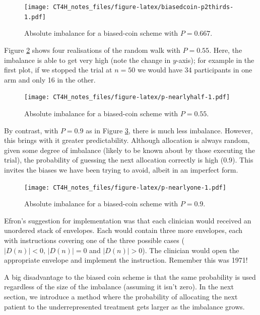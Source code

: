 \documentclass[
  openany]{book}
\theoremstyle{definition}
\theoremstyle{definition}
\theoremstyle{definition}
\theoremstyle{definition}
\theoremstyle{remark}
\begin{document}
\begin{figure}
\centering
\texttt{[image: CT4H\_notes\_files/figure-latex/biasedcoin-p2thirds-1.pdf]}
\caption{\label{fig:biasedcoin-p2thirds}Absolute imbalance for a biased-coin scheme with \(P=0.667\).}
\end{figure}

Figure \ref{fig:p-nearlyhalf} shows four realisations of the random walk with \(P=0.55\). Here, the imbalance is able to get very high (note the change in \(y\)-axis); for example in the first plot, if we stopped the trial at \(n=50\) we would have 34 participants in one arm and only 16 in the other.

\begin{figure}
\centering
\texttt{[image: CT4H\_notes\_files/figure-latex/p-nearlyhalf-1.pdf]}
\caption{\label{fig:p-nearlyhalf}Absolute imbalance for a biased-coin scheme with \(P = 0.55\).}
\end{figure}

By contrast, with \(P=0.9\) as in Figure \ref{fig:p-nearlyone}, there is much less imbalance. However, this brings with it greater predictability. Although allocation is always random, given some degree of imbalance (likely to be known about by those executing the trial), the probability of guessing the next allocation correctly is high (0.9). This invites the biases we have been trying to avoid, albeit in an imperfect form.

\begin{figure}
\centering
\texttt{[image: CT4H\_notes\_files/figure-latex/p-nearlyone-1.pdf]}
\caption{\label{fig:p-nearlyone}Absolute imbalance for a biased-coin scheme with \(P = 0.9\).}
\end{figure}

Efron's suggestion for implementation was that each clinician would received an unordered stack of envelopes. Each would contain three more envelopes, each with instructions covering one of the three possible cases (\(\lvert D\left(n\right)\rvert<0,\,\lvert D\left(n\right)\rvert=0\) and \(\lvert D\left(n\right)\rvert>0\)). The clinician would open the appropriate envelope and implement the instruction. Remember this was 1971!

A big disadvantage to the biased coin scheme is that the same probability is used regardless of the size of the imbalance (assuming it isn't zero). In the next section, we introduce a method where the probability of allocating the next patient to the underrepresented treatment gets larger as the imbalance grows.
\end{document}
